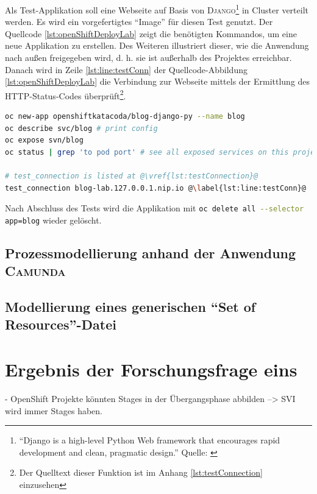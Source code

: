 \par
Als Test-Applikation soll eine Webseite auf Basis von \textsc{Django}\footnote{\enquote{Django is a high-level Python Web framework that encourages rapid development and clean, pragmatic design.} Quelle: \cite[][]{django_software_foundation_web_2020}} in Cluster verteilt werden. Es wird ein vorgefertigtes \enquote{Image} für diesen Test genutzt. Der Quellcode \vref{lst:openShiftDeployLab} zeigt die benötigten Kommandos, um eine neue Applikation zu erstellen. Des Weiteren illustriert dieser, wie die Anwendung nach außen freigegeben wird, d. h. sie ist außerhalb des Projektes erreichbar. Danach wird in Zeile \vref{lst:line:testConn} der Quellcode-Abbildung \vref{lst:openShiftDeployLab} die Verbindung zur Webseite mittels der Ermittlung des \textsc{HTTP}-Status-Codes überprüft\footnote{Der Quelltext dieser Funktion ist im Anhang \vref{lst:testConnection} einzusehen}.

\begin{lstlisting}[language=bash, caption={Test-\enquote{Deployment} ins \textsc{OpenShift}-Cluster}, label=lst:openShiftDeployLab]
oc new-app openshiftkatacoda/blog-django-py --name blog
oc describe svc/blog # print config 
oc expose svn/blog
oc status | grep 'to pod port' # see all exposed services on this project

# test_connection is listed at @\vref{lst:testConnection}@
test_connection blog-lab.127.0.0.1.nip.io @\label{lst:line:testConn}@
\end{lstlisting}

Nach Abschluss des Tests wird die Applikation mit \lstinline[language=sh]|oc delete all --selector app=blog| wieder gelöscht.

\subsection{Prozessmodellierung anhand der Anwendung \textsc{Camunda}}
\subsection{Modellierung eines generischen \enquote{Set of Resources}-Datei}

\section{Ergebnis der Forschungsfrage eins}
- OpenShift Projekte könnten Stages in der Übergangsphase abbilden --> SVI wird immer Stages haben.